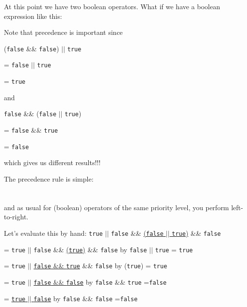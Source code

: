 {

  

At this point we have two boolean operators. What if we have a boolean expression like this:


Note that precedence is important since

(\verb!false! \&\& \verb!false!) $||$ \verb!true!

= \verb!false! $||$ \verb!true!

= \verb!true!

and

\verb!false! \&\& (\verb!false! $||$ \verb!true!)

= \verb!false! \&\& \verb!true!

= \verb!false!

which gives us different results!!!

The precedence rule is simple:
\\
\tab[9em]{\&\&}\\
\\

and as usual for (boolean) operators of the same priority level, you perform left-to-right.

Let's evaluate this by hand:
\texttt{true} $||$ \texttt{false} \&\& \underline{(\texttt{false} $||$ \texttt{true})} \&\& \texttt{false}

= \texttt{true} $||$ \texttt{false} \&\& \underline{(\texttt{true})} \&\& \texttt{false} by \texttt{false} $||$ \texttt{true} = \texttt{true}

= \texttt{true} $||$ \underline{\texttt{false} \&\& \texttt{true}} \&\& \texttt{false}   by (\texttt{true}) = \texttt{true}

= \texttt{true} $||$ \underline{\texttt{false} \&\& \texttt{false}}           by \texttt{false} \&\& \texttt{true} =\texttt{false}

= \underline{\texttt{true} $||$ \texttt{false}}                    by \texttt{false} \&\& \texttt{false} =\texttt{false}

}
